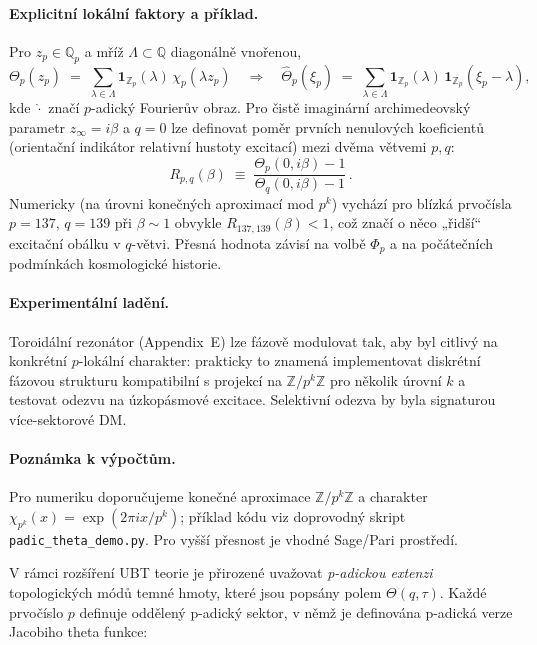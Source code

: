 \documentclass[12pt,a4paper]{article}
\numberwithin{equation}{section}
\theoremstyle{definition}
\theoremstyle{remark}
\begin{document}
\paragraph{Explicitní lokální faktory a příklad.}
Pro $z_p\!\in\!\mathbb{Q}_p$ a mříž $\Lambda\!\subset\!\mathbb{Q}$ diagonálně vnořenou,
\begin{equation}
\Theta_p(z_p) \;=\; \sum_{\lambda\in\Lambda} \mathbf{1}_{\mathbb{Z}_p}(\lambda)\,\chi_p(\lambda z_p)
\quad\Rightarrow\quad
\widehat{\Theta}_p(\xi_p) \;=\; \sum_{\lambda\in\Lambda} \mathbf{1}_{\mathbb{Z}_p}(\lambda)\,\mathbf{1}_{\mathbb{Z}_p}(\xi_p-\lambda),
\end{equation}
kde $\widehat{\cdot}$ značí $p$-adický Fourierův obraz. Pro čistě imaginární archimedeovský parametr $z_\infty=i\beta$ a $q=0$ lze definovat
poměr prvních nenulových koeficientů (orientační indikátor relativní hustoty excitací) mezi dvěma větvemi $p,q$:
\begin{equation}
R_{p,q}(\beta) \;\equiv\; \frac{\Theta_p(0,i\beta)-1}{\Theta_q(0,i\beta)-1}\,.
\end{equation}
Numericky (na úrovni konečných aproximací mod $p^k$) vychází pro blízká prvočísla $p=137$, $q=139$ při $\beta\!\sim\!1$ obvykle $R_{137,139}(\beta)<1$,
což značí o něco „řidší“ excitační obálku v $q$-větvi. Přesná hodnota závisí na volbě $\Phi_p$ a na počátečních podmínkách kosmologické historie.

\paragraph{Experimentální ladění.}
Toroidální rezonátor (Appendix~E) lze fázově modulovat tak, aby byl citlivý na konkrétní $p$-lokální charakter: prakticky to znamená implementovat
diskrétní fázovou strukturu kompatibilní s projekcí na $\mathbb{Z}/p^k\mathbb{Z}$ pro několik úrovní $k$ a testovat odezvu na úzkopásmové excitace.
Selektivní odezva by byla signaturou více-sektorové DM.

\paragraph{Poznámka k výpočtům.}
Pro numeriku doporučujeme konečné aproximace $\mathbb{Z}/p^k\mathbb{Z}$ a charakter $\chi_{p^k}(x)=\exp(2\pi i x/p^k)$; příklad kódu viz doprovodný skript
\texttt{padic\_theta\_demo.py}. Pro vyšší přesnost je vhodné Sage/Pari prostředí.

V rámci rozšíření UBT teorie je přirozené uvažovat \emph{p-adickou extenzi} topologických módů
temné hmoty, které jsou popsány polem $\Theta(q,\tau)$. Každé prvočíslo $p$ definuje oddělený
p-adický sektor, v němž je definována p-adická verze Jacobiho theta funkce:
\end{document}
